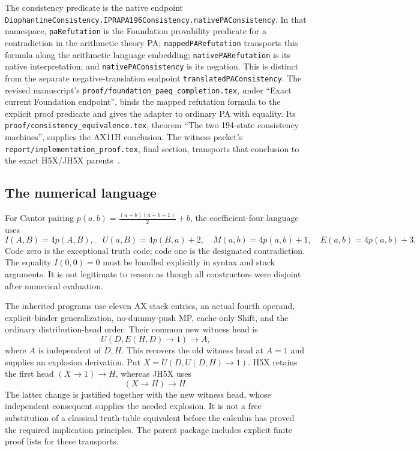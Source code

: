 \documentclass[11pt,letterpaper]{article}
\newcommand{\file}[1]{\texttt{\nolinkurl{#1}}}
\begin{document}
The consistency predicate is the native endpoint
\file{DiophantineConsistency.IPRAPA196Consistency.nativePAConsistency}.
In that namespace, \file{paRefutation} is the Foundation provability
predicate for a contradiction in the arithmetic theory PA;
\file{mappedPARefutation} transports this formula along the arithmetic
language embedding; \file{nativePARefutation} is its native interpretation;
and \file{nativePAConsistency} is its negation. This is distinct from the
separate negative-translation endpoint \file{translatedPAConsistency}.
The revised manuscript's \file{proof/foundation_paeq_completion.tex},
under ``Exact current Foundation endpoint'', binds the mapped refutation
formula to the explicit proof predicate and gives the adapter to ordinary
PA with equality. Its \file{proof/consistency_equivalence.tex}, theorem
``The two 194-state consistency machines'', supplies the AX11H conclusion.
The witness packet's \file{report/implementation_proof.tex}, final section,
transports that conclusion to the exact H5X/JH5X parents~\cite{witness,ax11h}.

\subsection{The numerical language}
For Cantor pairing $p(a,b)=\frac{(a+b)(a+b+1)}2+b$, the coefficient-four
language uses
\[
 I(A,B)=4p(A,B),\quad U(a,B)=4p(B,a)+2,\quad
 M(a,b)=4p(a,b)+1,\quad E(a,b)=4p(a,b)+3.
\]
Code zero is the exceptional truth code; code one is the designated
contradiction. The equality $I(0,0)=0$ must be handled explicitly in syntax
and stack arguments. It is not legitimate to reason as though all
constructors were disjoint after numerical evaluation.

The inherited programs use eleven AX stack entries, an actual fourth
operand, explicit-binder generalization, no-dummy-push MP, cache-only Shift,
and the ordinary distribution-head order. Their common new witness head is
\[
 U(D,E(H,D)\to1)\to A,
\]
where $A$ is independent of $D,H$. This recovers the old witness head at
$A=1$ and supplies an explosion derivation. Put
$X=U(D,U(D,H)\to1)$. H5X retains the first head
$(X\to1)\to H$, whereas JH5X uses
\[
 (X\to H)\to H.
\]
The latter change is justified together with the new witness head, whose
independent consequent supplies the needed explosion. It is not a free
substitution of a classical truth-table equivalent before the calculus has
proved the required implication principles. The parent package includes
explicit finite proof lists for these transports.
\end{document}
